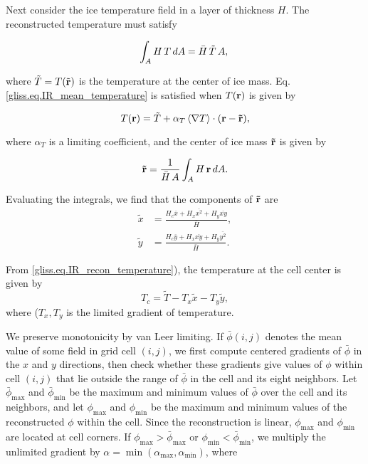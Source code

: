 Next consider the ice temperature field in a layer of thickness $H$. 
The reconstructed temperature must satisfy

\begin{equation}
  \label{gliss.eq.IR_mean_temperature}
  \int_A H \, T \, dA = \bar{H} \, \tilde{T} \, A,    \\
\end{equation}

\noindent
where $\tilde{T} = T(\tilde{\bf r})$ is the temperature at the center of ice mass.
Eq. \eqref{gliss.eq.IR_mean_temperature} is satisfied when $T({\bf r})$ is given by

\begin{equation}
  \label{gliss.eq.IR_recon_temperature}
  T({\bf r}) = \tilde{T} + \alpha_T \left<\nabla T\right> \cdot
                                     ({\bf r}-{\bf \tilde{r}}),
\end{equation}

\noindent
where $\alpha_T$ is a limiting coefficient, and the center of ice mass
${\bf\tilde{r}}$ is given by

\begin{equation}
{\bf \tilde{r}} = \frac{1}{\bar H \, A} \int_A H \, {\bf r} \, dA.
\end{equation}

\noindent
Evaluating the integrals, we find that the components of ${\bf \tilde{r}}$ are
\begin{equation}
  \begin{split}
    \tilde{x} & = \frac{H_c \overline{x} + H_x \overline{x^2} + H_y \overline{xy}} {\bar{H}}, \\
    \tilde{y} & = \frac{H_c \overline{y} + H_x \overline{xy} + H_y \overline{y^2}} {\bar{H}}.
  \end{split}
\end{equation}

\noindent
From \eqref{gliss.eq.IR_recon_temperature}), the temperature at the cell center is given by
\[ T_c = \tilde{T} - T_x \tilde{x} - T_y \tilde{y}, \]
where ($T_x, T_y$ is the limited gradient of temperature.

We preserve monotonicity by van Leer limiting. If
$\bar{\phi}(i,j)$ denotes the mean value of some field in grid cell
$(i,j)$, we first compute centered gradients of $\bar{\phi}$ in
the $x$ and $y$ directions, then check whether these gradients
give values of $\phi$ within cell $(i,j)$ that lie outside the
range of $\bar{\phi}$ in the cell and its eight neighbors.  Let
$\bar{\phi}_{\max}$ and $\bar{\phi}_{\min}$ be the maximum and
minimum values of $\bar{\phi}$ over the cell and its neighbors,
and let $\phi_{\max}$ and $\phi_{\min}$ be the maximum and minimum
values of the reconstructed $\phi$ within the cell.  Since the
reconstruction is linear, $\phi_{\max}$ and $\phi_{\min}$ are
located at cell corners.  If $\phi_{\max} > \bar{\phi}_{\max}$ or
$ \phi_{\min} < \bar{\phi}_{\min}$, we multiply the unlimited
gradient by $\alpha = \min(\alpha_{\max}, \alpha_{\min})$, where

